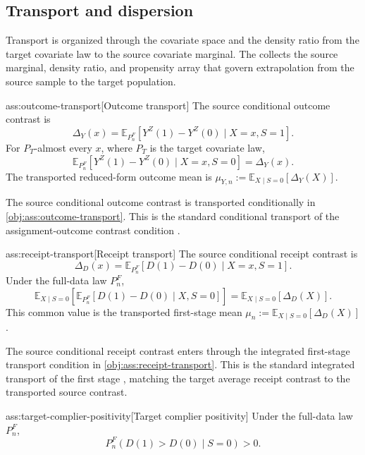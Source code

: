 \subsection{Transport and dispersion}

Transport is organized through the covariate space  and the density ratio  from the target covariate law to the source covariate marginal. The  collects the source marginal, density ratio, and propensity array that govern extrapolation from the source sample to the target population.

\begin{assumptionv}{ass:outcome-transport}[Outcome transport]
The source conditional outcome contrast is
\[
\Delta_Y(x)
=
\mathbb E_{P_n^F}\!\left[Y^Z(1)-Y^Z(0)\mid X=x,S=1\right].
\]
For \(P_T\)-almost every \(x\), where \(P_T\) is the target covariate law,
\[
\mathbb E_{P_n^F}\!\left[Y^Z(1)-Y^Z(0)\mid X=x,S=0\right]
=
\Delta_Y(x).
\]
The transported reduced-form outcome mean is \(\mu_{Y,n}:=\mathbb E_{X\mid S=0}[\Delta_Y(X)]\).
\end{assumptionv}

The source conditional outcome contrast  is transported conditionally in \cref{obj:ass:outcome-transport}. This is the standard conditional transport of the assignment-outcome contrast condition \citep{ChenHuang2025}.

\begin{assumptionv}{ass:receipt-transport}[Receipt transport]
The source conditional receipt contrast is
\[
\Delta_D(x)
=
\mathbb E_{P_n^F}\!\left[D(1)-D(0)\mid X=x,S=1\right].
\]
Under the full-data law \(P_n^F\),
\[
\mathbb E_{X\mid S=0}\!\left[
\mathbb E_{P_n^F}\!\left[D(1)-D(0)\mid X,S=0\right]
\right]
=
\mathbb E_{X\mid S=0}\!\left[\Delta_D(X)\right].
\]
This common value is the transported first-stage mean \(\mu_n:=\mathbb E_{X\mid S=0}[\Delta_D(X)]\).
\end{assumptionv}

The source conditional receipt contrast  enters through the integrated first-stage transport condition in \cref{obj:ass:receipt-transport}. This is the standard integrated transport of the first stage \citep{ChenHuang2025}, matching the target average receipt contrast to the transported source contrast.

\begin{assumptionv}{ass:target-complier-positivity}[Target complier positivity]
Under the full-data law \(P_n^F\),
\[
P_n^F\!\left(D(1)>D(0)\mid S=0\right)>0.
\]
\end{assumptionv}

